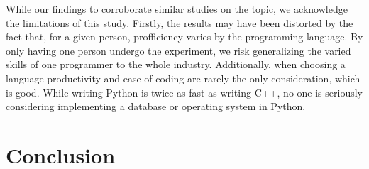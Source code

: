 \documentclass{article}
\begin{document}
While our findings to corroborate similar studies on the topic, we acknowledge the limitations of this study. Firstly, the results may have been distorted by the fact that, for a given person, profficiency varies by the programming language. By only having one person undergo the experiment, we risk generalizing the varied skills of one programmer to the whole industry. Additionally, when choosing a language productivity and ease of coding are rarely the only consideration, which is good. While writing Python is twice as fast as writing C++, no one is seriously considering implementing a database or operating system in Python.

\section{Conclusion}


\printbibliography
\end{document}
